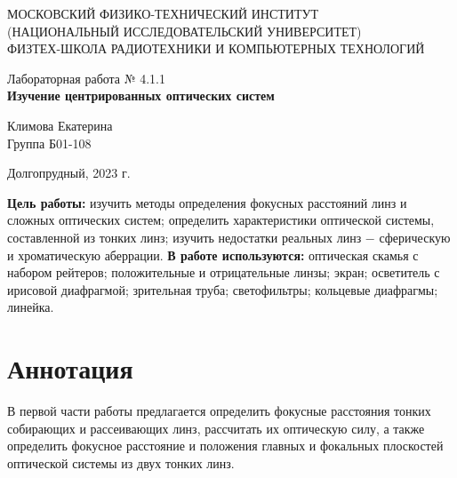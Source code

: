 \documentclass[a4paper,12pt]{article} %
\begin{document}
\begin{center}
	\footnotesize{МОСКОВСКИЙ ФИЗИКО-ТЕХНИЧЕСКИЙ ИНСТИТУТ\\(НАЦИОНАЛЬНЫЙ 			ИССЛЕДОВАТЕЛЬСКИЙ УНИВЕРСИТЕТ)}\\
	\footnotesize{ФИЗТЕХ-ШКОЛА РАДИОТЕХНИКИ И КОМПЬЮТЕРНЫХ ТЕХНОЛОГИЙ\\}
	\hfill \break
	\hfill \break
	\hfill \break
	\hfill \break
	\hfill \break
	\hfill \break
\end{center}

\begin{center}   
    \hfill \break
	\hfill \break
	\hfill \break
	\hfill \break
	\hfill \break
	\hfill \break
	\hfill \break
	\hfill \break
	\hfill \break
	\hfill \break
	\hfill \break
	\large{Лабораторная работа № 4.1.1\\\large{\textbf{Изучение центрированных оптических систем}}}\\
	\hfill \break
        \hfill \break
	\hfill \break
	\hfill \break
	\hfill \break
	\hfill \break
	\hfill \break
	\hfill \break
	\hfill \break
	\hfill \break
	\hfill \break
	\begin{flushright}
		Климова Екатерина\\
		Группа Б01-108
	\end{flushright}
	\hfill \break
\end{center}
\hfill \break
\hfill \break
\begin{center}
	Долгопрудный, 2023 г.
\end{center}
\thispagestyle{empty}

\newpage
\hfill \break
\textbf{Цель работы:} изучить методы определения фокусных расстояний линз и сложных оптических систем; определить характеристики оптической системы, составленной из тонких линз; изучить недостатки реальных линз $-$ сферическую и хроматическую аберрации.
\hfill \break
\hfill \break
\textbf{В работе используются:} оптическая скамья с набором рейтеров; положительные и отрицательные линзы; экран; осветитель с ирисовой диафрагмой; зрительная труба; светофильтры; кольцевые диафрагмы; линейка.

\section{Аннотация}
\hfill \break В первой части работы предлагается определить фокусные расстояния тонких собирающих и рассеивающих линз, рассчитать их оптическую силу, а также определить фокусное расстояние и положения главных и фокальных плоскостей оптической системы из двух тонких линз.
\end{document}
